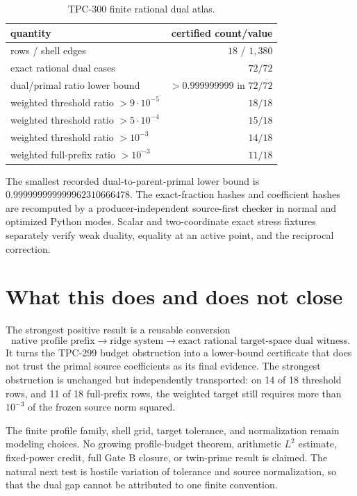 \documentclass[11pt]{article}
\begin{document}
\begin{table}[t]
\centering
\small
\caption{TPC-300 finite rational dual atlas.}
\label{tab:atlas}
\begin{tabular}{lr}
\toprule
quantity & certified count/value\\
\midrule
rows / shell edges & $18$ / $1,380$\\
exact rational dual cases & $72/72$\\
dual/primal ratio lower bound & $>0.999999999$ in $72/72$\\
weighted threshold ratio $>9\cdot10^{-5}$ & $18/18$\\
weighted threshold ratio $>5\cdot10^{-4}$ & $15/18$\\
weighted threshold ratio $>10^{-3}$ & $14/18$\\
weighted full-prefix ratio $>10^{-3}$ & $11/18$\\
\bottomrule
\end{tabular}
\end{table}

The smallest recorded dual-to-parent-primal lower bound is
$0.999999999999962310666478$.  The exact-fraction hashes and coefficient
hashes are recomputed by a producer-independent source-first checker in
normal and optimized Python modes.  Scalar and two-coordinate exact stress
fixtures separately verify weak duality, equality at an active point, and
the reciprocal correction.

\section{What this does and does not close}

The strongest positive result is a reusable conversion
\[
 \text{native profile prefix}
 \longrightarrow
 \text{ridge system}
 \longrightarrow
 \text{exact rational target-space dual witness}.
\]
It turns the TPC-299 budget obstruction into a lower-bound certificate that
does not trust the primal source coefficients as its final evidence.  The
strongest obstruction is unchanged but independently transported: on 14 of
18 threshold rows, and 11 of 18 full-prefix rows, the weighted target still
requires more than $10^{-3}$ of the frozen source norm squared.

The finite profile family, shell grid, target tolerance, and normalization
remain modeling choices.  No growing profile-budget theorem, arithmetic
$L^2$ estimate, fixed-power credit, full Gate B closure, or twin-prime result
is claimed.  The natural next test is hostile variation of tolerance and
source normalization, so that the dual gap cannot be attributed to one
finite convention.
\end{document}
